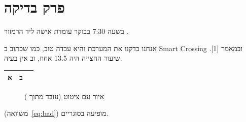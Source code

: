\chapter{פרק בדיקה}
\begin{scenebox}
בשעה 7:30 בבוקר עומדת אישה ליד הרמזור \cite{rosenbloom2009}.
\end{scenebox}
אנחנו בדקנו את המערכת והיא עבדה טוב, כמו שכתוב ב Smart Crossing ובמאמר [1].
שיעור החצייה היה 13.5 אחוז, וב אין בעיה.
\begin{table}[ht]
  \begin{tabular}{l|cc}
    \toprule
    א & ב \\
    \bottomrule
  \end{tabular}
\end{table}
\begin{figure}[ht]\label{fig:orphan}\end{figure}
\begin{figure}[ht]\caption{איור עם ציטוט (עובד מתוך \cite{rosenbloom2009})}\label{fig:citecap}\end{figure}
(משוואה~\eqref{eq:bad}) מופיעה בסוגריים.
